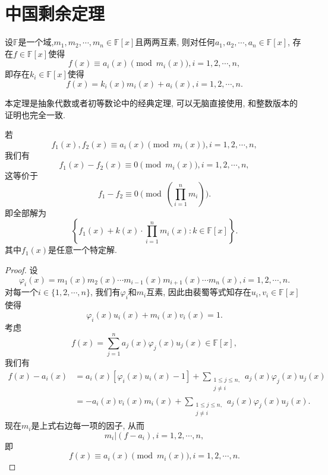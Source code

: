 \documentclass[../../main.tex]{subfiles}
\begin{document}
\section{中国剩余定理}

\begin{theorem}[中国剩余定理]\label{theorem:中国剩余定理(多项式版)}
设$\mathbb{F}$是一个域,$m_1,m_2,\cdots,m_n\in\mathbb{F}[x]$且两两互素, 则对任何$a_1,a_2,\cdots,a_n\in\mathbb{F}[x]$, 存在$f\in\mathbb{F}[x]$使得
$$
f(x)\equiv a_i(x)\pmod{m_i(x)},i=1,2,\cdots,n,
$$
即存在$k_i\in\mathbb{F}[x]$使得
$$
f(x)=k_i(x)m_i(x)+a_i(x),i=1,2,\cdots,n.
$$
\end{theorem}
\begin{note}
本定理是抽象代数或者初等数论中的经典定理, 可以无脑直接使用, 和整数版本的证明也完全一致.
\end{note}
\begin{remark}
若
$$
f_1(x),f_2(x)\equiv a_i(x)\pmod{m_i(x)},i=1,2,\cdots,n,
$$
我们有
$$
f_1(x)-f_2(x)\equiv0\pmod{m_i(x)},i=1,2,\cdots,n,
$$
这等价于
$$
f_1-f_2\equiv0\pmod{\left(\prod_{i=1}^{n}m_i\right)}.
$$
即全部解为
$$
\left\{f_1(x)+k(x)\cdot\prod_{i=1}^{n}m_i(x):k\in\mathbb{F}[x]\right\}.
$$
其中$f_1(x)$是任意一个特定解.
\end{remark}
\begin{proof}
设
$$
\varphi_i(x)=m_1(x)m_2(x)\cdots m_{i-1}(x)m_{i+1}(x)\cdots m_n(x),i=1,2,\cdots,n.
$$
对每一个$i\in\{1,2,\cdots,n\}$, 我们有$\varphi_i$和$m_i$互素, 因此由裴蜀等式知存在$u_i,v_i\in\mathbb{F}[x]$使得
$$
\varphi_i(x)u_i(x)+m_i(x)v_i(x)=1.
$$
考虑
$$
f(x)=\sum_{j=1}^{n}a_j(x)\varphi_j(x)u_j(x)\in\mathbb{F}[x],
$$
我们有
$$
\begin{aligned}
f(x)-a_i(x)&=a_i(x)\left[\varphi_i(x)u_i(x)-1\right]+\sum_{\substack{1\leqslant j\leqslant n,\\j\neq i}}a_j(x)\varphi_j(x)u_j(x)\\
&=-a_i(x)v_i(x)m_i(x)+\sum_{\substack{1\leqslant j\leqslant n,\\j\neq i}}a_j(x)\varphi_j(x)u_j(x).
\end{aligned}
$$
现在$m_i$是上式右边每一项的因子, 从而
$$
m_i|(f-a_i),i=1,2,\cdots,n,
$$
即
$$
f(x)\equiv a_i(x)\pmod{m_i(x)},i=1,2,\cdots,n.
$$
\end{proof}
\end{document}
